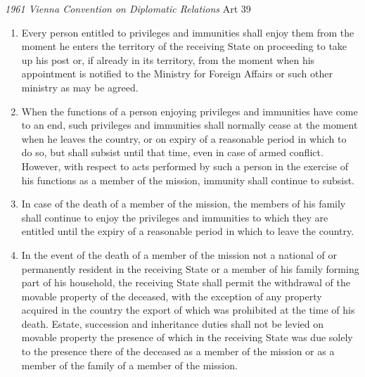 \begin{conventiondetails}{\textit{1961 Vienna Convention on Diplomatic Relations} Art 39}
    \flushleft
    \begin{enumerate}
        \item Every person entitled to privileges and immunities shall enjoy them from the moment he enters the territory of the receiving State on proceeding to take up his post or, if already in its territory, from the moment when his appointment is notified to the Ministry for Foreign Affairs or such other ministry as may be agreed.
        \item When the functions of a person enjoying privileges and immunities have come to an end,  such privileges and immunities shall normally cease at the moment when he leaves the country, or on expiry of a reasonable period in which to do so, but shall subsist until that time, even in case of armed conflict. However, with respect to acts performed by such a person in the exercise of his functions as a member of the mission, immunity shall continue to subsist.
        \item In case of the death of a member of the mission, the members of his family shall continue to enjoy the privileges and immunities to which they are entitled until the expiry of a reasonable period in which to leave the country.
        \item  In the event of the death of a member of the mission not a national of or permanently resident in the receiving State or a member of his family forming part of his household, the receiving State shall permit the withdrawal of the movable property of the deceased, with the exception of any property acquired in the country the export of which was prohibited at the time of his death. Estate, succession and inheritance duties shall not be levied on movable property the presence of which in the receiving State was due solely to the presence there of the deceased as a member of the mission or as a member of the family of a member of the mission.
    \end{enumerate}
\end{conventiondetails}

